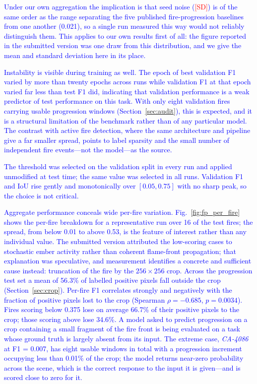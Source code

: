 \documentclass[sensors,article,submit,moreauthors,pdftex]{Definitions/mdpi}
\newcommand{\rev}[1]{\textcolor{blue}{#1}}
\newcommand{\fpSD}{\textcolor{red}{[SD]}}
\begin{document}
\rev{Under our own aggregation the implication is that seed noise (\fpSD{}) is
of the same order as the range separating the five published fire-progression
baselines from one another (0.021), so a single run measured this way would not
reliably distinguish them. This applies to our own results first of all: the
figure reported in the submitted version was one draw from this distribution,
and we give the mean and standard deviation here in its place.}

\rev{Instability is visible during training as well. The epoch of best
validation F1 varied by more than twenty epochs across runs while validation F1
at that epoch varied far less than test F1 did, indicating that validation
performance is a weak predictor of test performance on this task. With only
eight validation fires carrying usable progression windows
(Section~\ref{sec:audit}), this is expected, and it is a structural limitation of
the benchmark rather than of any particular model. The contrast with active fire
detection, where the same architecture and pipeline give a far smaller spread,
points to label sparsity and the small number of independent fire events---not
the model---as the source.}

\rev{The threshold was selected on the validation split in every run and applied
unmodified at test time; the same value was selected in all runs. Validation F1
and IoU rise gently and monotonically over $[0.05, 0.75]$ with no sharp peak, so
the choice is not critical.}

\rev{Aggregate performance conceals wide per-fire variation. Fig.~\ref{fig:fp_per_fire}
shows the per-fire breakdown for a representative run over 16 of the test fires;
the spread, from below 0.01 to above 0.53, is the feature of interest rather
than any individual value. The submitted version attributed the low-scoring
cases to stochastic ember activity rather than coherent flame-front propagation;
that explanation was speculative, and measurement identifies a concrete and
sufficient cause instead: truncation of the fire by the $256 \times 256$ crop.
Across the progression test set a mean of 56.3\% of labelled positive pixels
fall outside the crop (Section~\ref{sec:crop}). Per-fire F1 correlates strongly and negatively with
the fraction of positive pixels lost to the crop (Spearman $\rho = -0.685$,
$p = 0.0034$). Fires scoring below 0.375 lose on average 66.7\% of their
positive pixels to the crop; those scoring above lose 34.6\%. A model asked to
predict progression on a crop containing a small fragment of the fire front is
being evaluated on a task whose ground truth is largely absent from its input.
The extreme case, \textit{CA-4086} at F1 = 0.007, has eight usable windows in
total with a progression increment occupying less than 0.01\% of the crop; the
model returns near-zero probability across the scene, which is the correct response to the input it is given---and is scored close to zero for it.}
\end{document}
